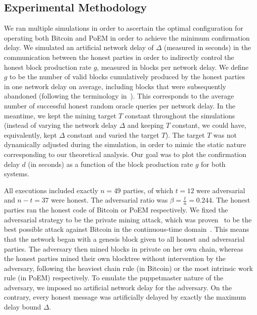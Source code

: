 \subsection{Experimental Methodology}

We ran multiple simulations
in order to ascertain the optimal configuration for
operating both Bitcoin and PoEM in order to achieve the minimum confirmation delay.
We simulated an artificial network delay of $\Delta$ (measured in seconds) in the
communication between the honest parties in order to indirectly control the honest
block production rate $g$, measured in blocks per network delay. We define $g$ to
be the number of valid blocks cumulatively produced by the honest parties in one
network delay on average, including blocks that were subsequently abandoned
(following the terminology in~\cite{eiar}). This corresponds to the average number of
successful honest random oracle queries per network delay.
In the meantime,
we kept the mining target $T$ constant throughout the simulations (instead of varying
the network delay $\Delta$ and keeping $T$ constant, we could have, equivalently, kept
$\Delta$ constant and varied the target $T$). The target $T$ was not dynamically adjusted
during the simulation, in order to mimic the static nature corresponding to our theoretical
analysis.
Our goal was to plot the confirmation delay $d$ (in seconds) as a function of the
block production rate $g$ for both systems.

All executions included exactly
$n = 49$ parties, of which $t = 12$ were adversarial and $n - t = 37$ were honest.
The adversarial ratio was $\beta = \frac{t}{n} = 0.244$.
The honest parties ran the honest code of Bitcoin or PoEM respectively.
We fixed the adversarial strategy to be the private mining attack, which was
proven~\cite{eiar} to be the best possible attack against Bitcoin in the
continuous-time domain~\cite{bitcoin-made-simple}. This means that the network
began with a genesis block given to all honest and adversarial parties. The adversary
then mined blocks in private on her own chain, whereas the honest parties mined
their own blocktree without intervention by the adversary, following the heaviest chain
rule (in Bitcoin) or the most intrinsic work rule (in PoEM) respectively. To emulate the puppetmaster
nature of the adversary, we imposed no artificial network delay for the adversary.
On the contrary, every honest message was artificially delayed by exactly the maximum
delay bound $\Delta$.

